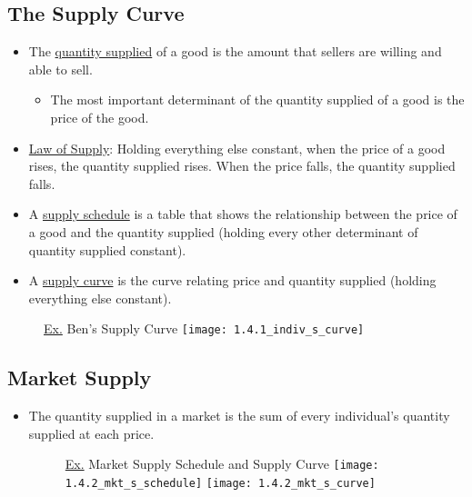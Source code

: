 \subsection{The Supply Curve}

	\begin{itemize}
	
	\item The \underline{quantity supplied} of a good is the amount that sellers are willing and able to sell.
	
		\begin{itemize}
		
		\item The most important determinant of the quantity supplied of a good is the price of the good.
		
		\end{itemize}
		
	\item \underline{Law of Supply}: Holding everything else constant, when the price of a good rises, the quantity supplied rises. When the price falls, the quantity supplied falls.
	
	\item A \underline{supply schedule} is a table that shows the relationship between the price of a good and the quantity supplied (holding every other determinant of quantity supplied constant).
	
	\item A \underline{supply curve} is the curve relating price and quantity supplied (holding everything else constant).
	
	\end{itemize}
	
	\begin{figure}[p]
	\underline{Ex.} Ben's Supply Curve
	\centering
	\texttt{[image: 1.4.1\_indiv\_s\_curve]}
	\end{figure}
	
\subsection{Market Supply}

	\begin{itemize}
	
	\item The quantity supplied in a market is the sum of every individual's quantity supplied at each price.
	
	\begin{figure}[p]
	\underline{Ex.} Market Supply Schedule and Supply Curve
	\centering
	\texttt{[image: 1.4.2\_mkt\_s\_schedule]}
	\texttt{[image: 1.4.2\_mkt\_s\_curve]}
	\end{figure}
	
	\end{itemize}
	
